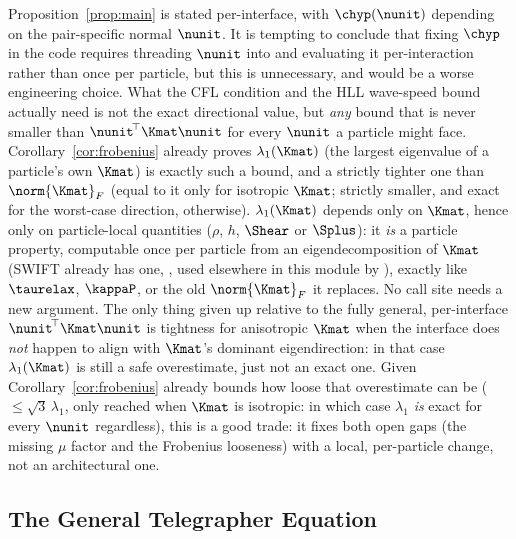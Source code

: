 \begin{remark}
\label{rem:lambda-max-not-n}
Proposition~\ref{prop:main} is stated per-interface, with $\chyp(\nunit)$
depending on the pair-specific normal $\nunit$. It is tempting to conclude
that fixing $\chyp$ in the code requires threading $\nunit$ into
 and evaluating it
per-interaction rather than once per particle, but this is unnecessary,
and would be a worse engineering choice. What the CFL condition and the
HLL wave-speed bound actually need is not the exact directional value, but
\emph{any} bound that is never smaller than $\nunit^{\!\top}\Kmat\nunit$
for every $\nunit$ a particle might face. Corollary~\ref{cor:frobenius}
already proves $\lambda_1(\Kmat)$ (the largest eigenvalue of a
particle's own $\Kmat$) is exactly such a bound, and a strictly tighter
one than $\norm{\Kmat}_F$ (equal to it only for isotropic $\Kmat$; strictly
smaller, and exact for the worst-case direction, otherwise). $\lambda_1(\Kmat)$
depends only on $\Kmat$, hence only on particle-local quantities ($\rho$,
$h$, $\Shear$ or $\Splus$): it \emph{is} a particle property, computable
once per particle from an eigendecomposition of $\Kmat$ (SWIFT already has
one, , used elsewhere in this module
by ), exactly like $\taurelax$,
$\kappaP$, or the old $\norm{\Kmat}_F$ it replaces. No call site needs a
new argument. The only thing given up relative to the fully general,
per-interface $\nunit^{\!\top}\Kmat\nunit$ is tightness for anisotropic
$\Kmat$ when the interface does \emph{not} happen to align with $\Kmat$'s
dominant eigendirection: in that case $\lambda_1(\Kmat)$ is still a safe
overestimate, just not an exact one. Given Corollary~\ref{cor:frobenius}
already bounds how loose that overestimate can be
($\leq\sqrt3\,\lambda_1$, only reached when $\Kmat$ is isotropic: in
which case $\lambda_1$ \emph{is} exact for every $\nunit$ regardless), this
is a good trade: it fixes both open gaps (the missing $\mu$ factor and the
Frobenius looseness) with a local, per-particle change, not an
architectural one.
\end{remark}

\subsection{The General Telegrapher Equation}
\label{sec:telegrapher}

